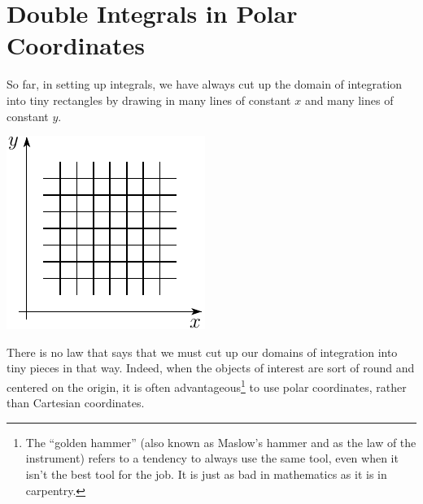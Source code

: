 \section{Double Integrals in Polar Coordinates} \label{sec polars}
So far, in setting up integrals, we have always cut up the
domain of integration into tiny rectangles by drawing in many lines
of constant $x$ and many lines of constant $y$.
\begin{efig}
\begin{center}
   \includegraphics{intDecomp3.pdf}
\end{center}
\end{efig}
There is no law that says that we must cut up our domains of integration
into tiny pieces in that way. Indeed, when the objects of interest
are sort of round and centered on the origin, it is often 
advantageous\footnote{The ``golden hammer'' (also known as Maslow's hammer
and as the law of the instrument) refers to a tendency to always use 
the same tool, even when it isn't the best tool for the job.
It is just as bad in mathematics as it is in carpentry.} 
to use polar coordinates, rather than Cartesian coordinates. 


